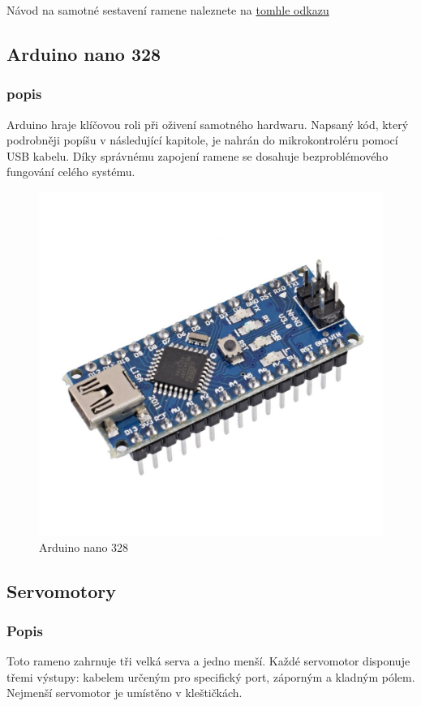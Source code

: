 \documentclass[12pt, a4paper,
twoside,        %
openright
]{report}
\begin{document}
{Návod na samotné sestavení ramene naleznete na \href{https://www.instructables.com/EEZYbotARM-Mk2-3D-Printed-Robot/}{tomhle odkazu} 
\newpage 


\subsection{Arduino nano 328}
\subsubsection{popis}

Arduino hraje klíčovou roli při oživení samotného hardwaru. Napsaný kód, který podrobněji popíšu v následující kapitole, je nahrán do mikrokontroléru pomocí USB kabelu. Díky správnému zapojení ramene se dosahuje bezproblémového fungování celého systému.


	\begin{figure}[h]
	
	\centering
	\includegraphics[width=0.6\linewidth]{image/arduino.jpg} 
	
	\caption{Arduino nano 328 } %
	\label{fig:Arduino} %
\end{figure}

\newpage 

\subsection{Servomotory }
\subsubsection{Popis}
	
	Toto rameno zahrnuje tři velká serva a jedno menší. Každé servomotor disponuje třemi výstupy: kabelem určeným pro specifický port, záporným a kladným pólem. 
	\\ Nejmenší servomotor je umístěno v kleštičkách.
\begin{figure}[h]
	

\end{figure}}
\end{document}
